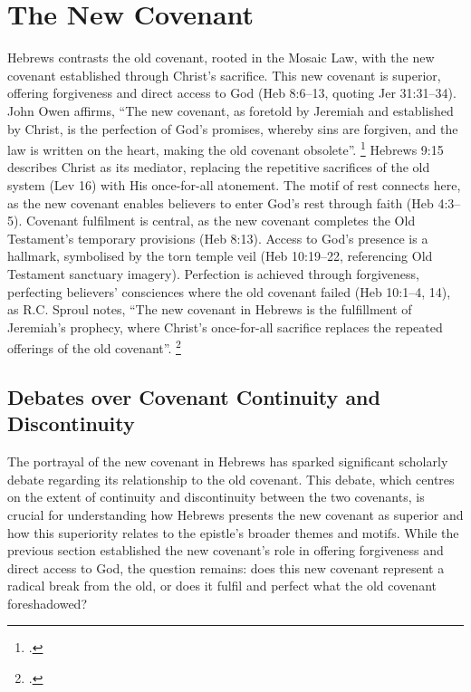 \documentclass[12pt]{article}
\begin{document}
\section{The New Covenant}
Hebrews contrasts the old covenant, rooted in the Mosaic Law, with the new
covenant established through Christ’s sacrifice. This new covenant is superior,
offering forgiveness and direct access to God (Heb 8:6--13, quoting Jer
31:31--34). John Owen affirms, ``The new covenant, as foretold by Jeremiah and
established by Christ, is the perfection of God’s promises, whereby sins are
forgiven, and the law is written on the heart, making the old covenant
obsolete''. \footcite[4:123]{Owen1854}
Hebrews 9:15 describes Christ as its mediator,
replacing the repetitive sacrifices of the old system (Lev 16) with His
once-for-all atonement. The motif of rest connects here, as the new covenant
enables believers to enter God’s rest through faith (Heb 4:3--5). Covenant
fulfilment is central, as the new covenant completes the Old Testament’s
temporary provisions (Heb 8:13). Access to God’s presence is a hallmark,
symbolised by the torn temple veil (Heb 10:19--22, referencing Old Testament
sanctuary imagery). Perfection is achieved through forgiveness, perfecting
believers’ consciences where the old covenant failed (Heb 10:1--4, 14), as R.C.
Sproul notes, ``The new covenant in Hebrews is the fulfillment of Jeremiah’s
prophecy, where Christ’s once-for-all sacrifice replaces the repeated offerings
of the old covenant''. \footcite[45]{Sproul1985}

\subsection{Debates over Covenant Continuity and Discontinuity}
The portrayal of the new covenant in Hebrews has sparked significant scholarly
debate regarding its relationship to the old covenant. This debate, which
centres on the extent of continuity and discontinuity between the two covenants,
is crucial for understanding how Hebrews presents the new covenant as superior
and how this superiority relates to the epistle’s broader themes and motifs.
While the previous section established the new covenant’s role in offering
forgiveness and direct access to God, the question remains: does this new
covenant represent a radical break from the old, or does it fulfil and perfect
what the old covenant foreshadowed?
\end{document}
